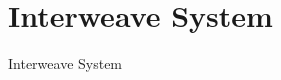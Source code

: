 \documentclass[16pt]{beamer}
\newif\ifinter
\begin{document}

\fi

\ifinter
\section{Interweave System}
\begin{frame}[c]{}
\begin{center}
Interweave System
\end{center}
\end{frame}
\end{document}
